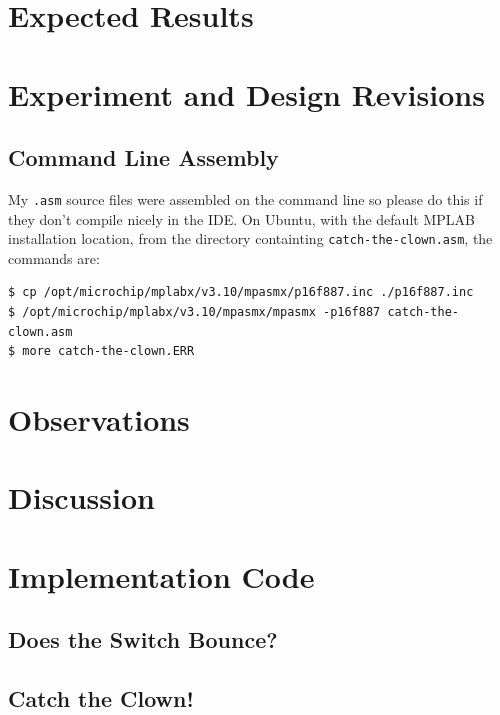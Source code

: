 \documentclass[11pt]{article}
\begin{document}
\section{Expected Results}

\section{Experiment and Design Revisions}

\subsection{Command Line Assembly}

My \texttt{.asm} source files were assembled on the command line so
please do this if they don't compile nicely in the IDE.
On Ubuntu, with the default MPLAB installation location, 
from the directory containting \texttt{catch-the-clown.asm}, the commands are:
\begin{verbatim}
$ cp /opt/microchip/mplabx/v3.10/mpasmx/p16f887.inc ./p16f887.inc
$ /opt/microchip/mplabx/v3.10/mpasmx/mpasmx -p16f887 catch-the-clown.asm
$ more catch-the-clown.ERR
\end{verbatim}

\section{Observations}

\section{Discussion}

\clearpage

\section{Implementation Code}

\subsection{Does the Switch Bounce?}
\label{debounce-time-code}


\subsection{Catch the Clown!}
\label{catch-the-clown-code}

\end{document}

